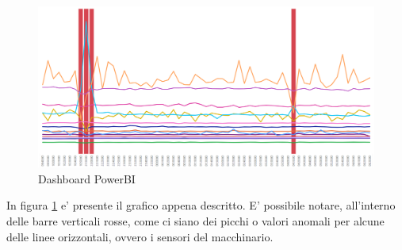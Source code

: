 \begin{figure}[t]
	\centering
	\includegraphics[width=14cm, scale=1]{images/powerbi}
	\caption{Dashboard PowerBI}
	\label{powerbi}
\end{figure}

In figura \ref{powerbi} e' presente il grafico appena descritto. E' possibile notare, all'interno delle barre verticali rosse, come ci siano dei picchi o valori anomali per alcune delle linee orizzontali, ovvero i sensori del macchinario. 